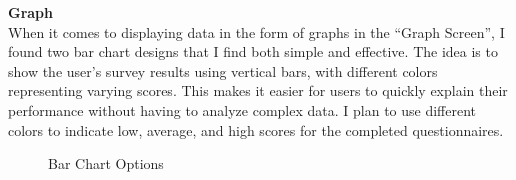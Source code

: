 \vspace{5mm}

\noindent \textbf{Graph} \\
When it comes to displaying data in the form of graphs in the ``Graph Screen'', I found two bar chart designs that I find both simple and effective. The idea is to show the user's survey results using vertical bars, with different colors representing varying scores. This makes it easier for users to quickly explain their performance without having to analyze complex data. I plan to use different colors to indicate low, average, and high scores for the completed questionnaires.

\vspace{5mm}

\FloatBarrier
\begin{figure}[htbp]
    \centering
    \label{fig:bar_chart_1}
    \hfill
    \label{fig:bar_chart_2}
    \caption{Bar Chart Options}
\end{figure}
\FloatBarrier

